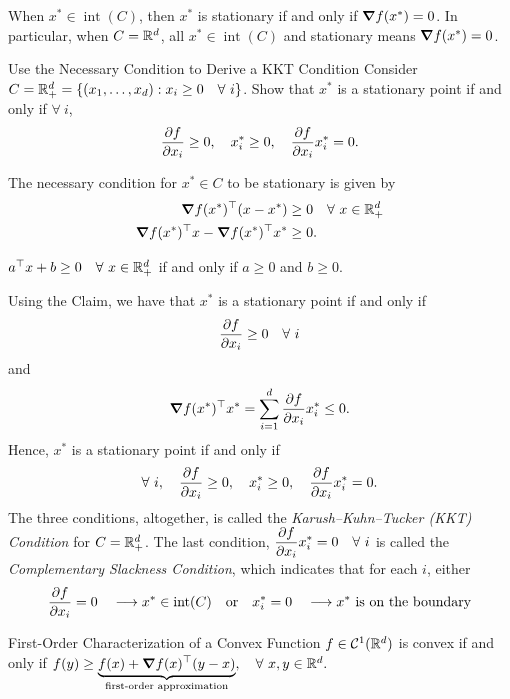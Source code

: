 \begin{rmk}
	When $x^*\in\operatorname{int}(C)$, then $x^*$ is stationary if and only if $\grad f(x^*)=0$. In particular, when $C={\mathbb{R}}^d$, all $x^*\in\operatorname{int}(C)$ and stationary means $\grad f(x^*)=0$.
\end{rmk}
\begin{eg}{Use the Necessary Condition to Derive a KKT Condition}
	Consider $C=\R_+^d=\qty{(x_1,\dots,x_d):x_i\geq0\quad\forall\ i}$. Show that $x^*$ is a stationary point if and only if $\forall\ i$, \[\pdv{f}{x_i} (x^*)\geq0,\quad x_i^*\geq0,\quad\pdv{f}{x_i} (x^*)x_i^*=0.\]
	\begin{prf}
		The necessary condition for $x^*\in C$ to be stationary is given by \begin{align*}\grad f(x^*)^\top(x-x^*)&\geq0\quad\forall\ x\in{\mathbb{R}}^d_+\\\grad f(x^*)^\top x-\grad f(x^*)^\top x^*&\geq0.\end{align*}
		\begin{clm*}
		$a^\top x+b\geq0\quad\forall\ x\in\R_+^d$ if and only if $a\geq0$ and $b\geq0$.
		\end{clm*}
		Using the Claim, we have that $x^*$ is a stationary point if and only if \[\pdv{f}{x_i} (x^*)\geq0\quad\forall\ i\] and \[\grad f(x^*)^\top x^*=\sum_{i=1}^d\pdv{f}{x_i} (x^*)x_i^*\leq0.\] Hence, $x^*$ is a stationary point if and only if \[\forall\ i,\quad\pdv{f}{x_i} (x^*)\geq0,\quad x_i^*\geq0,\quad \pdv{f}{x_i} (x^*)x_i^*=0.\] The three conditions, altogether, is called the \textit{Karush–Kuhn–Tucker (KKT) Condition} for $C={\mathbb{R}}^d_+$. The last condition, $\displaystyle\pdv{f}{x_i} (x^*)x_i^*=0\quad\forall\ i$ is called the \textit{Complementary Slackness Condition}, which indicates that for each $i$, either \[\pdv{f}{x_i} (x^*)=0\quad\longrightarrow x^*\in\operatorname{int}(C)\quad\text{or}\quad x_i^*=0\quad\longrightarrow x^*\text{ is on the boundary}\]
	\end{prf}
\end{eg}
\begin{thm}{First-Order Characterization of a Convex Function}
	$f\in{\mathcal{C}}^1({\mathbb{R}}^d)$ is convex if and only if $f(y)\geq\underbrace{f(x)+\grad f(x)^\top(y-x)}_\text{first-order approximation},\quad\forall\ x,y\in\R^d.$
\end{thm}
